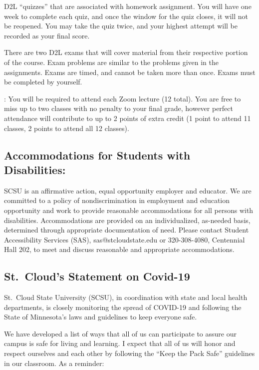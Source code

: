 \documentclass{tufte-handout}
\begin{document}
\begin{fullwidth}

  D2L ``quizzes'' that are associated with homework assignment. You will have one week to complete each quiz, and once the window for the quiz closes, it will not be reopened. You may take the quiz twice, and your highest attempt will be recorded as your final score.



 There are two D2L exams that will cover material from their respective portion of the course. Exam problems are similar to the problems given in the assignments. Exams are timed, and cannot be taken more than once. Exams must be completed by yourself.



: You will be required to attend each Zoom lecture (12 total). You are free to miss up to two classes with no penalty to your final grade, however perfect attendance will contribute to up to 2 points of extra credit (1 point to attend 11 classes, 2 points to attend all 12 classes).



\subsection{Accommodations for Students with Disabilities: } 

SCSU is an affirmative action, equal opportunity employer and educator. We are committed to a policy of nondiscrimination in employment and education opportunity and work to provide reasonable accommodations for all persons with disabilities. Accommodations are provided on an individualized, as-needed basis, determined through appropriate documentation of need. Please contact Student Accessibility Services (SAS), sas@stcloudstate.edu or 320-308-4080, Centennial Hall 202, to meet and discuss reasonable and appropriate accommodations. 


\subsection*{St.\ Cloud's Statement on Covid-19}

St.\ Cloud State University (SCSU), in coordination with state and local health departments, is closely monitoring the spread of COVID-19 and following the State of Minnesota's laws and guidelines to keep everyone safe.

We have developed a list of ways that all of us can participate to assure our campus is safe for living and learning. I expect that all of us will honor and respect ourselves and each other by following the ``Keep the Pack Safe'' guidelines in our classroom. As a reminder:


\end{fullwidth}
\end{document}
